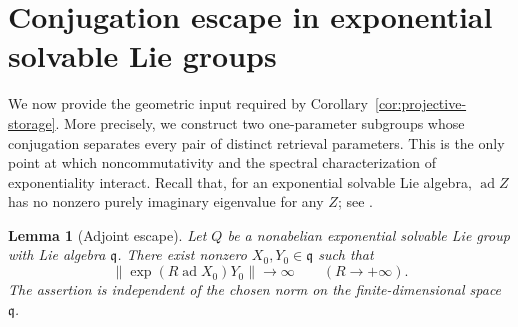 \documentclass[10pt,a4paper]{amsart}
\numberwithin{equation}{section}
\newtheorem{lemma}[theorem]{Lemma}
\newcommand{\ad}{\operatorname{ad}}
\begin{document}
\section{Conjugation escape in exponential solvable Lie groups}
\label{sec:geometry}

We now provide the geometric input required by
Corollary~\ref{cor:projective-storage}.  More precisely, we construct two
one-parameter subgroups whose conjugation separates every pair of distinct
retrieval parameters.  This is the only point at which noncommutativity and
the spectral characterization of exponentiality interact.  Recall that, for
an exponential solvable Lie algebra, $\ad Z$ has no nonzero purely imaginary
eigenvalue for any $Z$; see
\cite[Chapter~1, Theorem~1]{LeptinLudwig1994}.

\begin{lemma}[Adjoint escape]\label{lem:lie-escape}
Let $Q$ be a nonabelian exponential solvable Lie group with Lie algebra
$\mathfrak q$.  There exist nonzero $X_0,Y_0\in\mathfrak q$ such that
\begin{equation}\label{eq:ad-escape}
 \|\exp(R\ad X_0)Y_0\|\longrightarrow\infty
 \qquad(R\to+\infty).
\end{equation}
The assertion is independent of the chosen norm on the finite-dimensional
space $\mathfrak q$.
\end{lemma}
\end{document}
